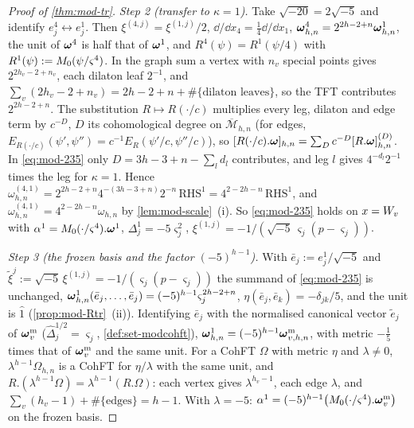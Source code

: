 \begin{proof}[Proof of \cref{thm:mod-tr}]
\emph{Step 2 (transfer to $\kappa=1$).} Take $\sqrt{-20}=2\sqrt{-5}$ and identify $e^4_j\leftrightarrow e^1_j$. Then $\xi^{(4,j)}=\xi^{(1,j)}/2$, $\dd/\dd x_4=\frac14\dd/\dd x_1$, $\boldsymbol{\omega}^4_{h,n}=2^{2h-2+n}\boldsymbol{\omega}^1_{h,n}$, the unit of $\boldsymbol{\omega}^4$ is half that of $\boldsymbol{\omega}^1$, and $R^4(\psi)=R^1(\psi/4)$ with $R^1(\psi):=M_{0}(\psi/\varsigma^4)$. In the graph sum a vertex with $n_v$ special points gives $2^{2h_v-2+n_v}$, each dilaton leaf $2^{-1}$, and $\sum_v(2h_v-2+n_v)=2h-2+n+\#\{\text{dilaton leaves}\}$, so the TFT contributes $2^{2h-2+n}$. The substitution $R\mapsto R(\cdot/c)$ multiplies every leg, dilaton and edge term by $c^{-D}$, $D$ its cohomological degree on $\overline{\mathcal M}_{h,n}$ (for edges, $E_{R(\cdot/c)}(\psi',\psi'')=c^{-1}E_R(\psi'/c,\psi''/c)$), so $[R(\cdot/c).\boldsymbol{\omega}]_{h,n}=\sum_Dc^{-D}[R.\boldsymbol{\omega}]^{(D)}_{h,n}$. In \eqref{eq:mod-235} only $D=3h-3+n-\sum_ld_l$ contributes, and leg $l$ gives $4^{-d_l}2^{-1}$ times the leg for $\kappa=1$. Hence $\omega^{(4,1)}_{h,n}=2^{2h-2+n}4^{-(3h-3+n)}2^{-n}\,\mathrm{RHS}^1=4^{2-2h-n}\,\mathrm{RHS}^1$, and $\omega^{(4,1)}_{h,n}=4^{2-2h-n}\omega_{h,n}$ by \cref{lem:mod-scale}~(i). So \eqref{eq:mod-235} holds on $x=W_{v}$ with $\alpha^1=M_{0}(\cdot/\varsigma^4).\boldsymbol{\omega}^1$, $\Delta^1_j=-5\varsigma_j^2$, $\xi^{(1,j)}=-1/(\sqrt{-5}\,\varsigma_j(p-\varsigma_j))$.

\emph{Step 3 (the frozen basis and the factor $(-5)^{h-1}$).} With $\bar e_j:=e^1_j/\sqrt{-5}$ and $\tilde\xi^j:=\sqrt{-5}\,\xi^{(1,j)}=-1/(\varsigma_j(p-\varsigma_j))$ the summand of \eqref{eq:mod-235} is unchanged, $\boldsymbol{\omega}^1_{h,n}(\bar e_j,\dots,\bar e_j)=(-5)^{h-1}\varsigma_j^{2h-2+n}$, $\eta(\bar e_j,\bar e_k)=-\delta_{jk}/5$, and the unit is $\hat 1$ (\cref{prop:mod-Rtr}~(ii)). Identifying $\bar e_j$ with the normalised canonical vector $\tilde e_j$ of $\boldsymbol{\omega}^{\mathrm m}_v$ ($\hat\Delta_j^{1/2}=\varsigma_j$, \cref{def:set-modcohft}), $\boldsymbol{\omega}^1_{h,n}=(-5)^{h-1}\boldsymbol{\omega}^{\mathrm m}_{v,h,n}$, with metric $-\frac15$ times that of $\boldsymbol{\omega}^{\mathrm m}_v$ and the same unit. For a CohFT $\Omega$ with metric $\eta$ and $\lambda\neq 0$, $\lambda^{h-1}\Omega_{h,n}$ is a CohFT for $\eta/\lambda$ with the same unit, and $R.(\lambda^{h-1}\Omega)=\lambda^{h-1}(R.\Omega)$: each vertex gives $\lambda^{h_v-1}$, each edge $\lambda$, and $\sum_v(h_v-1)+\#\{\text{edges}\}=h-1$. With $\lambda=-5$: $\alpha^1=(-5)^{h-1}\big(M_{0}(\cdot/\varsigma^4).\boldsymbol{\omega}^{\mathrm m}_v\big)$ on the frozen basis.


\end{proof}
